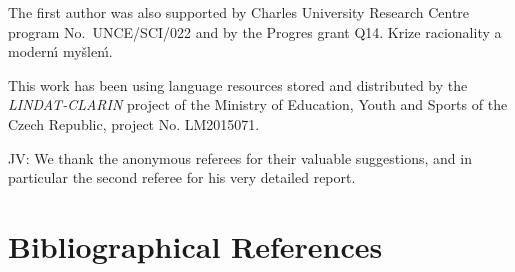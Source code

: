 \documentclass[10pt, a4paper]{article}
\newcommand{\jv}[1]{{\color{svlinks} JV: #1}}
\begin{document}
The first author was also supported by Charles University Research Centre program No.\ UNCE/SCI/022 and by the Progres grant Q14. Krize racionality a {modern\'\i} my\v{s}len\'\i.

This work has been using language resources stored and distributed by the \textit{LINDAT-CLARIN} project of the Ministry of Education, Youth and Sports of the Czech Republic, project No. LM2015071.

\jv{We thank the anonymous referees for their valuable suggestions, and in particular the second referee for his very detailed report.}



\section{Bibliographical References}
\label{main:ref}




\end{document}
